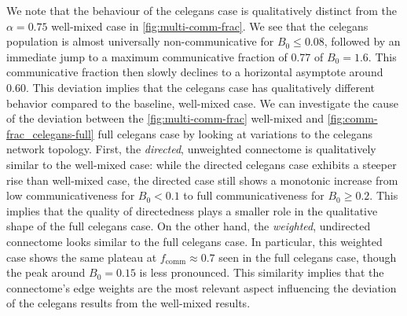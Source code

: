 \documentclass[pdflatex,twocolumn,sn-nature,super]{sn-jnl}
\begin{document}
We note that the behaviour
of the  \gls{celegans} case
is qualitatively distinct
from the $\alpha = 0.75$ well-mixed case in \cref{fig:multi-comm-frac}.
We see that the \gls{celegans} population is almost universally non-communicative
for $B_0 \le 0.08$,
followed by an immediate jump to a maximum communicative fraction
of \num{0.77} of $B_0 = 1.6$.
This communicative fraction then slowly declines
to a horizontal asymptote around \num{0.60}.
This deviation implies that the \gls{celegans} case
has qualitatively different behavior compared to the baseline, well-mixed case.
We can investigate the cause of the deviation
between the \cref{fig:multi-comm-frac} well-mixed
and \cref{fig:comm-frac_celegans-full} full \gls{celegans} case
by looking at variations to the \gls{celegans} network topology.
First, the 
\emph{directed}, unweighted connectome
is qualitatively similar to the
well-mixed case:
while the directed \gls{celegans} case exhibits a steeper rise
than well-mixed case,
the directed case still shows a monotonic increase
from low communicativeness for $B_0 < 0.1$
to full communicativeness for $B_0 \ge 0.2$.
This implies that the quality of directedness
plays a smaller role in the qualitative shape
of the  full \gls{celegans} case.
On the other hand,
the 
\emph{weighted}, undirected connectome
looks similar to the 
full \gls{celegans} case.
In particular, this 
weighted case
shows the same plateau at $f_{\text{comm}} \approx 0.7$
seen in the  full \gls{celegans} case,
though the peak around $B_0 = 0.15$ is less pronounced.
This similarity implies that the connectome's edge weights
are the most relevant aspect influencing the deviation
of the  \gls{celegans}
results from the well-mixed results.
\end{document}
